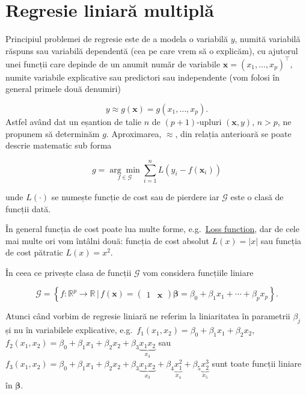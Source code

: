 \documentclass[]{article}
\begin{document}
\hypertarget{regresie-liniara-multipla}{%
\section{Regresie liniară multiplă}\label{regresie-liniara-multipla}}

Principiul problemei de regresie este de a modela o variabilă \(y\),
numită variabilă răspuns sau variabilă dependentă (cea pe care vrem să o
explicăm), cu ajutorul unei funcții care depinde de un anumit număr de
variabile \(\boldsymbol x = (x_1,\ldots, x_p)^\intercal\), numite
variabile explicative sau predictori sau independente (vom folosi în
general primele două denumiri)

\[
  y\approx g(\boldsymbol x) = g(x_1,\ldots, x_p).
\] Astfel având dat un eșantion de talie \(n\) de \((p+1)\)-upluri
\((\boldsymbol x, y)\), \(n>p\), ne propunem să determinăm \(g\).
Aproximarea, \(\approx\), din relația anterioară se poate descrie
matematic sub forma

\[
  g = \underset{f\in\mathcal{G}}{\arg\min}\sum_{i = 1}^{n}L\left(y_i - f(\boldsymbol x_i)\right)
\]

unde \(L(\cdot)\) se numește funcție de cost sau de pierdere iar
\(\mathcal{G}\) este o clasă de funcții dată.

În general funcția de cost poate lua multe forme,
e.g.~\href{https://en.wikipedia.org/wiki/Loss_function}{Loss function},
dar de cele mai multe ori vom întâlni două: funcția de cost absolut
\(L(x) = |x|\) sau funcția de cost pătratic \(L(x) = x^2\).

În ceea ce privește clasa de funcții \(\mathcal{G}\) vom considera
funcțiile liniare

\[
\mathcal{G} = \left\{f:\mathbb{R}^p\to \mathbb{R}\,|\, f(\boldsymbol x) = \begin{pmatrix}1 & \boldsymbol x\end{pmatrix} \boldsymbol \beta = \beta_0 + \beta_1 x_1 +\cdots + \beta_p x_p\right\}.
\]

Atunci când vorbim de regresie liniară ne referim la liniaritatea în
parametrii \(\beta_j\) și nu în variabilele explicative,
e.g.~\(f_1(x_1,x_2) = \beta_0 + \beta_1 x_1 + \beta_2 x_2\),
\(f_2(x_1, x_2) = \beta_0 + \beta_1 x_1 + \beta_2 x_2 + \beta_3 \underbrace{x_1 x_2}_{x_3}\)
sau
\(f_3(x_1, x_2) = \beta_0 + \beta_1 x_1 + \beta_2 x_2 + \beta_3 \underbrace{x_1 x_2}_{x_3}+ \beta_4 \underbrace{x_1^2}_{x_4}+ \beta_5 \underbrace{x_2^3}_{x_5}\)
sunt toate funcții liniare în \(\boldsymbol\beta\).
\end{document}
